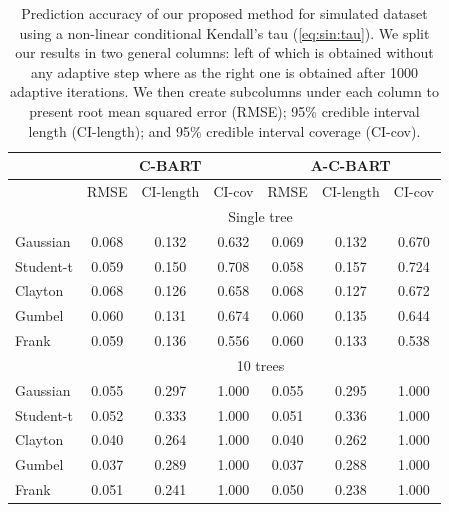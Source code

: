 \documentclass{amsart}
\begin{document}
\begin{table}[ht]
	\centering
	\begin{tabular}{l|ccc|ccc}
		\multicolumn{1}{c|}{} &
		\multicolumn{3}{c|}{C-BART} &
		\multicolumn{3}{c}{A-C-BART} \\
		\midrule
		& RMSE & CI-length & CI-cov & RMSE & CI-length & CI-cov \\ 
		\midrule
		\multicolumn{1}{c}{} &
		\multicolumn{6}{c}{Single tree} \\
		\midrule
		Gaussian & 0.068 & 0.132 & 0.632 & 0.069 & 0.132 & 0.670 \\ 
		Student-t & 0.059 & 0.150 & 0.708 & 0.058 & 0.157 & 0.724 \\ 
		Clayton & 0.068 & 0.126 & 0.658 & 0.068 & 0.127 & 0.672 \\ 
		Gumbel & 0.060 & 0.131 & 0.674 & 0.060 & 0.135 & 0.644 \\ 
		Frank & 0.059 & 0.136 & 0.556 & 0.060 & 0.133 & 0.538 \\ 
		\midrule
		\multicolumn{1}{c}{} &
		\multicolumn{6}{c}{10 trees} \\
		\midrule
		Gaussian & 0.055 & 0.297 & 1.000 & 0.055 & 0.295 & 1.000 \\ 
		Student-t & 0.052 & 0.333 & 1.000 & 0.051 & 0.336 & 1.000 \\ 
		Clayton & 0.040 & 0.264 & 1.000 & 0.040 & 0.262 & 1.000 \\ 
		Gumbel & 0.037 & 0.289 & 1.000 & 0.037 & 0.288 & 1.000 \\ 
		Frank & 0.051 & 0.241 & 1.000 & 0.050 & 0.238 & 1.000 \\  
	\end{tabular}
	\caption{Prediction accuracy of our proposed method for simulated dataset using a non-linear conditional Kendall's tau (\cref{eq:sin:tau}). We split our results in two general columns: left of which is obtained without any adaptive step where as the right one is obtained after 1000 adaptive iterations. We then create subcolumns under each column to present root mean squared error (RMSE); 95\% credible interval length (CI-length); and 95\% credible interval coverage (CI-cov).}
	\label{tab:pred:ex2}
\end{table}

\end{document}

